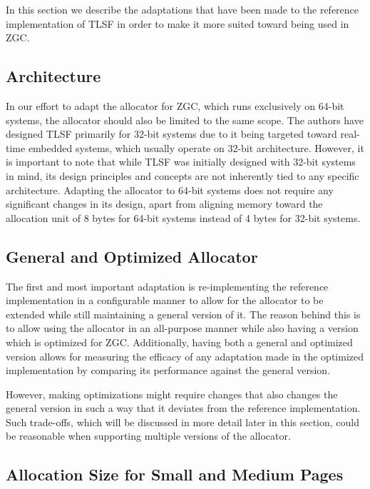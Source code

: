 
In this section we describe the adaptations that have been made to the reference implementation of TLSF in order to make it more suited toward being used in ZGC.

\subsection{Architecture}

In our effort to adapt the allocator for ZGC, which runs exclusively on 64-bit systems, the allocator should also be limited to the same scope. The authors have designed TLSF primarily for 32-bit systems due to it being targeted toward real-time embedded systems, which usually operate on 32-bit architecture. However, it is important to note that while TLSF was initially designed with 32-bit systems in mind, its design principles and concepts are not inherently tied to any specific architecture. Adapting the allocator to 64-bit systems does not require any significant changes in its design, apart from aligning memory toward the allocation unit of 8 bytes for 64-bit systems instead of 4 bytes for 32-bit systems.

\subsection{General and Optimized Allocator}

The first and most important adaptation is re-implementing the reference implementation in a configurable manner to allow for the allocator to be extended while still maintaining a general version of it. The reason behind this is to allow using the allocator in an all-purpose manner while also having a version which is optimized for ZGC. Additionally, having both a general and optimized version allows for measuring the efficacy of any adaptation made in the optimized implementation by comparing its performance against the general version.

However, making optimizations might require changes that also changes the general version in such a way that it deviates from the reference implementation. Such trade-offs, which will be discussed in more detail later in this section, could be reasonable when supporting multiple versions of the allocator.

\subsection{Allocation Size for Small and Medium Pages}


